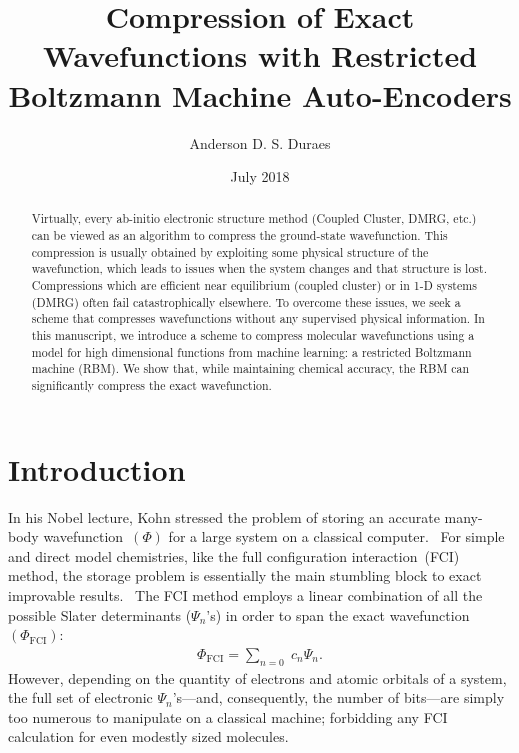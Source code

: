 \documentclass[%
 amsmath,amssymb,
 aps,prl, %
 reprint,%
]{revtex4-1}
\begin{document}
\title{Compression of Exact Wavefunctions with Restricted Boltzmann Machine Auto-Encoders}

\author{Anderson D. S. Duraes}
{}%

\date{July 2018}
\begin{abstract}
    Virtually, every ab-initio electronic structure method (Coupled Cluster, DMRG, etc.) can be viewed as an algorithm to compress the ground-state wavefunction. This compression is usually obtained by exploiting some physical structure of the wavefunction, which leads to issues when the system changes and that structure is lost. Compressions which are efficient near equilibrium (coupled cluster) or in 1-D systems (DMRG) often fail catastrophically elsewhere. To overcome these issues, we seek a scheme that compresses wavefunctions without any supervised physical information. In this manuscript, we introduce a scheme to compress molecular wavefunctions using a model for high dimensional functions from machine learning: a restricted Boltzmann machine (RBM). We show that, while maintaining chemical accuracy, the RBM can significantly compress the exact wavefunction.
\end{abstract}


\maketitle


\section{Introduction}

\indent In his Nobel lecture, Kohn stressed the problem of storing an accurate many-body wavefunction~$(\Phi)$ for a large system on a classical computer.~\cite{Kohn1999} For simple and direct model chemistries, like the full configuration interaction~(FCI) method, the storage problem is essentially the main stumbling block to exact improvable results.~\cite{Bauschlicher1989,Roos1972,Olsen1990,Shepard1990,Szabo1989,Mayer2003,Helgaker2000} The FCI method employs a linear combination of all the possible Slater determinants ($\Psi_{n}$'s) in order to span the exact wavefunction~$(\Phi_{\text{FCI}})$:~\cite{Bauschlicher1989,Szabo1989,Mayer2003,Helgaker2000} 
\begin{align}
    \Phi_{\text{FCI}}=\sum_{n=0}\;c_{n}\Psi_{n}\text{.}
    \label{fci_disc_eq}
\end{align}
\indent However, depending on the quantity of electrons and atomic orbitals of a system, the full set of electronic $\Psi_{n}$'s---and, consequently, the number of bits---are simply too numerous to manipulate on a classical machine; forbidding any FCI calculation for even modestly sized molecules.~\cite{Szabo1989,Bauschlicher1989,Taylor2013,Olsen1990,Helgaker2000}
\end{document}
